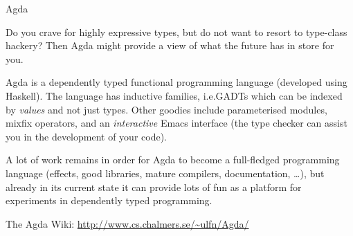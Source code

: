 \documentclass{article}
\begin{document}
\begin{hcarentry}{Agda}
\makeheader

Do you crave for highly expressive types, but do not want to resort to
type-class hackery? Then Agda might provide a view of what the future
has in store for you.

Agda is a dependently typed functional programming language (developed
using Haskell). The language has inductive families, i.e.\@ GADTs
which can be indexed by \emph{values} and not just types. Other
goodies include parameterised modules, mixfix operators, and an
\emph{interactive} Emacs interface (the type checker can assist you in
the development of your code).

A lot of work remains in order for Agda to become a full-fledged
programming language (effects, good libraries, mature compilers,
documentation, \ldots), but already in its current state it can
provide lots of fun as a platform for experiments in dependently typed
programming.

\FurtherReading
  The Agda Wiki: \url{http://www.cs.chalmers.se/~ulfn/Agda/}
\end{hcarentry}
\end{document}
